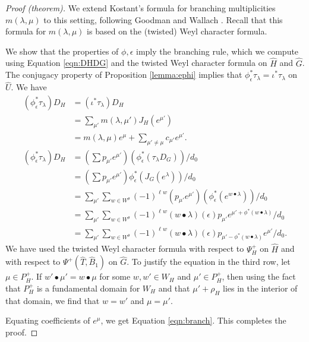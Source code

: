 \begin{proof}[Proof (theorem)]
  We extend Kostant's formula for branching multiplicities
  $m(\lambda,\mu)$ to this setting, following Goodman and Wallach
  \cite[\S8.2.2]{goodman}.  Recall that this formula for
  $m(\lambda,\mu)$ is based on the (twisted) Weyl character formula.

  We show that the properties of $\phi,\epsilon$ imply the branching
  rule, which we compute using Equation \ref{eqn:DHDG} and the twisted
  Weyl character formula on $\hat H$ and $\hat G$.  The conjugacy
  property of Proposition \ref{lemma:ephi} implies that
  $\phi_\epsilon^*\tau_\lambda = \iota^*\tau_\lambda$ on $\hat U$.  We
  have
\begin{align*}
(\phi^*_\epsilon\tau_\lambda) D_H 
 &= (\iota^*\tau_\lambda) D_H\\
 &= \sum_{\mu'} m(\lambda,{\mu'}) J_H(e^{\mu'})\\
  &= m(\lambda,\mu)e^\mu + \sum_{\mu'\ne\mu} c_{\mu'} e^{\mu'}.\\
(\phi^*_\epsilon\tau_\lambda) D_H 
  &= (\sum p_{\mu'} e^{\mu'})(\phi^*_\epsilon(\tau_\lambda D_{G})) /d_0\\
  &= (\sum p_{\mu'} e^{\mu'}) \phi^*_\epsilon(J_G(e^\lambda)) /d_0\\
  &= \sum_{\mu'} \sum_{w\in W^\theta} (-1)^{\ell w} 
  (p_{\mu'} e^{\mu'}) (\phi^*_\epsilon (e^{w\bullet \lambda})) /d_0\\
  &= \sum_{\mu'} \sum_{w\in W^\theta} (-1)^{\ell w}  
 ({w\bullet\lambda})(\epsilon) p_{\mu'}
e^{\mu'+\phi^*(w\bullet \lambda)} /d_0\\
  &= \sum_{\mu'} \sum_{w\in W^\theta} 
(-1)^{\ell w} ({w\bullet\lambda})(\epsilon) 
 p_{\mu' - \phi^*({w\bullet \lambda})} e^{\mu'} /d_0.
\end{align*}
We have used the twisted Weyl character formula with respect to $\Psi^+_H$ on $\hat H$
and with respect to $\Psi^+(\hat T,\hat B_1)$  on $\hat G$.
To justify the equation in the third row, let $\mu\in P_H^+$.  If
$w'\bullet \mu' = w\bullet \mu$ for some $w,w'\in W_H$ and $\mu'\in
P_H^+$, then using the fact that $P_H^+$ is a fundamental domain for
$W_H$ and that $\mu'+\rho_H$ lies in the interior of that domain, we
find that $w=w'$ and $\mu=\mu'$.

Equating coefficients of $e^\mu$, we get Equation \ref{eqn:branch}.
This completes the proof.
\end{proof}



